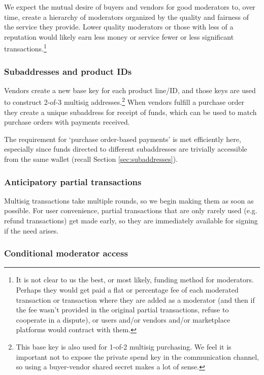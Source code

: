 We expect the mutual desire of buyers and vendors for good moderators to, over time, create a hierarchy of moderators organized by the quality and fairness of the service they provide. Lower quality moderators or those with less of a reputation would likely earn less money or service fewer or less significant transactions.\footnote{It is not clear to us the best, or most likely, funding method for moderators. Perhaps they would get paid a flat or percentage fee of each moderated transaction or transaction where they are added as a moderator (and then if the fee wasn't provided in the original partial transactions, refuse to cooperate in a dispute), or users and/or vendors and/or marketplace platforms would contract with them.}

\subsubsection*{Subaddresses and product IDs}

Vendors create a new base key for each product line/ID, and those keys are used to construct 2-of-3 multisig addresses.\footnote{This base key is also used for 1-of-2 multisig purchasing. We feel it is important not to expose the private spend key in the communication channel, so using a buyer-vendor shared secret makes a lot of sense.} When vendors fulfill a purchase order they create a unique subaddress for receipt of funds, which can be used to match purchase orders with payments received.

The requirement for `purchase order-based payments' is met efficiently here, especially since funds directed to different subaddresses are trivially accessible from the same wallet (recall Section \ref{sec:subaddresses}).

\subsubsection*{Anticipatory partial transactions}

Multisig transactions take multiple rounds, so we begin making them as soon as possible. For user convenience, partial transactions that are only rarely used (e.g. refund transactions) get made early, so they are immediately available for signing if the need arises.

\subsubsection*{Conditional moderator access}

